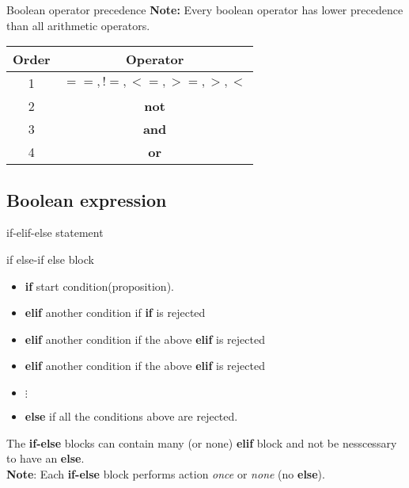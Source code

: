 \documentclass{beamer}
\begin{document}
\begin{frame}{Boolean operator precedence}
    \textbf{Note:} Every boolean operator has lower precedence than all arithmetic operators.
    \begin{center}
        \begin{tabular}{|c|c|}
            \hline
            Order & Operator          \\
            \hline
            1     & $==,!=,<=,>=,>,<$ \\
            \hline
            2     & \textbf{not}      \\
            \hline
            3     & \textbf{and}      \\
            \hline
            4     & \textbf{or}       \\
            \hline
        \end{tabular}
    \end{center}
\end{frame}

\begin{frame}
    \begin{example}
        
    \end{example}
\end{frame}

\subsection[Boolean expression]{Boolean expression}
\begin{frame}{if-elif-else statement}
    \begin{block}{if else-if else block}
        \begin{itemize}
            \item \textbf{if} start condition(proposition).
            \item \textbf{elif} another condition if \textbf{if} is rejected
            \item \textbf{elif} another condition if the above \textbf{elif} is rejected
            \item \textbf{elif} another condition if the above \textbf{elif} is rejected
            \item $\vdots$
            \item \textbf{else} if all the conditions above are rejected.
        \end{itemize}
        The \textbf{if-else} blocks can contain many (or none) \textbf{elif} block and not be nesscessary to have an \textbf{else}. \\
        \textbf{Note}: Each \textbf{if-else} block performs action \textit{once} or \textit{none} (no \textbf{else}).
    \end{block}
\end{frame}
\end{document}
